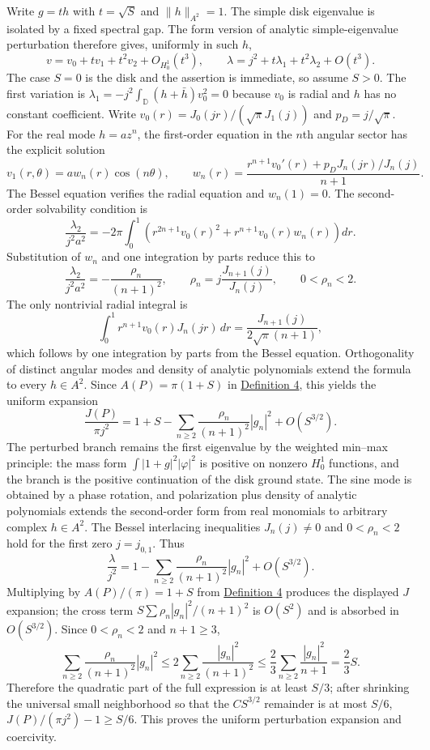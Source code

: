 \documentclass[11pt]{article}
\begin{document}
Write \(g=t h\) with \(t=\sqrt S\) and \(\|h\|_{A^2}=1\). The simple
disk eigenvalue is isolated by a fixed spectral gap. The form version of
analytic simple-eigenvalue perturbation therefore gives, uniformly in
such \(h\), \[
v=v_0+t v_1+t^2v_2+O_{H^1_0}(t^3),
\qquad
\lambda= j^2+t\lambda_1+t^2\lambda_2+O(t^3).
\] The case \(S=0\) is the disk and the assertion is immediate, so
assume \(S>0\). The first variation is
\(\lambda_1=-j^2\int_{\mathbb D}(h+\bar h)v_0^2=0\) because \(v_0\) is
radial and \(h\) has no constant coefficient. Write
\(v_0(r)=J_0(jr)/(\sqrt\pi J_1(j))\) and \(p_D=j/\sqrt\pi\). For the
real mode \(h=a z^n\), the first-order equation in the \(n\)th angular
sector has the explicit solution \[
v_1(r,\theta)=a w_n(r)\cos(n\theta),\qquad
w_n(r)=\frac{r^{n+1}v_0'(r)+p_DJ_n(jr)/J_n(j)}{n+1}.
\] The Bessel equation verifies the radial equation and \(w_n(1)=0\).
The second-order solvability condition is \[
\frac{\lambda_2}{j^2a^2}=-2\pi\int_0^1\left(r^{2n+1}v_0(r)^2+r^{n+1}v_0(r)w_n(r)\right)dr.
\] Substitution of \(w_n\) and one integration by parts reduce this to
\[
\frac{\lambda_2}{j^2a^2}=-\frac{\rho_n}{(n+1)^2},
\qquad \rho_n=j\frac{J_{n+1}(j)}{J_n(j)},\qquad 0<\rho_n<2.
\] The only nontrivial radial integral is \[
\int_0^1r^{n+1}v_0(r)J_n(jr)\,dr
=\frac{J_{n+1}(j)}{2\sqrt\pi(n+1)},
\] which follows by one integration by parts from the Bessel equation.
Orthogonality of distinct angular modes and density of analytic
polynomials extend the formula to every \(h\in A^2\). Since
\(A(P)=\pi(1+S)\) in \hyperref[def-conformal-data]{Definition 4}, this
yields the uniform expansion \[
\frac{J(P)}{\pi j^2}=1+S-\sum_{n\ge2}\frac{\rho_n}{(n+1)^2}|g_n|^2+O(S^{3/2}).
\] The perturbed branch remains the first eigenvalue by the weighted
min--max principle: the mass form \(\int|1+g|^2|\varphi|^2\) is positive
on nonzero \(H^1_0\) functions, and the branch is the positive
continuation of the disk ground state. The sine mode is obtained by a
phase rotation, and polarization plus density of analytic polynomials
extends the second-order form from real monomials to arbitrary complex
\(h\in A^2\). The Bessel interlacing inequalities \(J_n(j)\ne0\) and
\(0<\rho_n<2\) hold for the first zero \(j=j_{0,1}\). Thus \[
\frac{\lambda}{j^2}=1-\sum_{n\ge2}\frac{\rho_n}{(n+1)^2}|g_n|^2+O(S^{3/2}).
\] Multiplying by \(A(P)/(\pi)=1+S\) from
\hyperref[def-conformal-data]{Definition 4} produces the displayed \(J\)
expansion; the cross term \(S\sum\rho_n|g_n|^2/(n+1)^2\) is \(O(S^2)\)
and is absorbed in \(O(S^{3/2})\). Since \(0<\rho_n<2\) and \(n+1\ge3\),
\[
\sum_{n\ge2}\frac{\rho_n}{(n+1)^2}|g_n|^2
\le2\sum_{n\ge2}\frac{|g_n|^2}{(n+1)^2}
\le\frac23\sum_{n\ge2}\frac{|g_n|^2}{n+1}=\frac23S.
\] Therefore the quadratic part of the full expression is at least
\(S/3\); after shrinking the universal small neighborhood so that the
\(CS^{3/2}\) remainder is at most \(S/6\), \(J(P)/(\pi j^2)-1\ge S/6\).
This proves the uniform perturbation expansion and coercivity.
\end{document}
